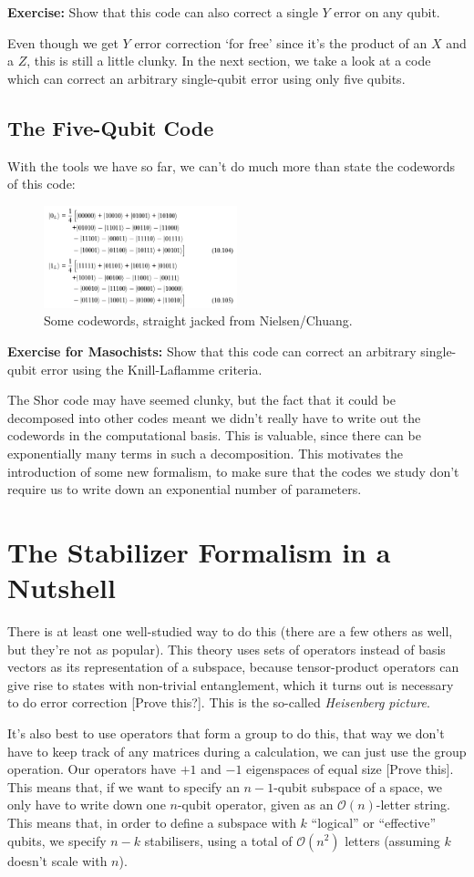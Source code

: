 \documentclass[10pt,a4paper, english]{scrartcl}
\begin{document}
\textbf{Exercise: } Show that this code can also correct a single $Y$ error on any qubit. 

Even though we get $Y$ error correction `for free' since it's the product of an $X$ and a $Z$, this is still a little clunky. In the next section, we take a look at a code which can correct an arbitrary single-qubit error using only five qubits.
\subsection{The Five-Qubit Code}
With the tools we have so far, we can't do much more than state the codewords of this code:
\begin{figure}[!h]
\centering
\includegraphics[width=0.5\textwidth]{five_qubit_codewords.png}
\caption{Some codewords, straight jacked from Nielsen/Chuang.}
\end{figure}
\textbf{Exercise for Masochists: }Show that this code can correct an arbitrary single-qubit error using the Knill-Laflamme criteria.

The Shor code may have seemed clunky, but the fact that it could be decomposed into other codes meant we didn't really have to write out the codewords in the computational basis.
This is valuable, since there can be exponentially many terms in such a decomposition. 
This motivates the introduction of some new formalism, to make sure that the codes we study don't require us to write down an exponential number of parameters.
\section{The Stabilizer Formalism in a Nutshell}
There is at least one well-studied way to do this (there are a few others as well, but they're not as popular).
This theory uses sets of operators instead of basis vectors as its representation of a subspace, because tensor-product operators can give rise to states with non-trivial entanglement, which it turns out is necessary to do error correction [Prove this?].
This is the so-called \emph{Heisenberg picture}. 

It's also best to use operators that form a group to do this, that way we don't have to keep track of any matrices during a calculation, we can just use the group operation. 
Our operators have $+1$ and $-1$ eigenspaces of equal size [Prove this]. 
This means that, if we want to specify an $n-1$-qubit subspace of a space, we only have to write down one $n$-qubit operator, given as an $\mathcal{O}(n)$-letter string. 
This means that, in order to define a subspace with $k$ ``logical'' or ``effective'' qubits, 
we specify $n-k$ stabilisers, using a total of $\mathcal{O}(n^2)$ letters (assuming $k$ doesn't scale with $n$).
\end{document}
